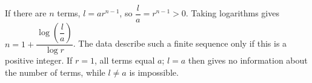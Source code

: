 If there are $n$ terms, $l=ar^{n-1}$, so $\dfrac{l}{a}=r^{n-1}>0$. Taking logarithms gives $\boxed{n=1+\dfrac{\log(\dfrac{l}{a})}{\log r}}$. The data describe such a finite sequence only if this is a positive integer. If $r=1$, all terms equal $a$; $l=a$ then gives no information about the number of terms, while $l\ne a$ is impossible.
